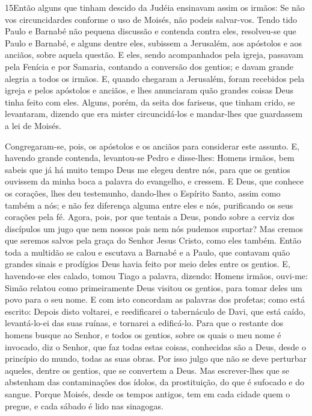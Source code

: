 \lettrine{15} Então alguns que tinham descido da Judéia
ensinavam assim os irmãos: Se não vos circuncidardes conforme o uso
de Moisés, não podeis salvar-vos. Tendo tido Paulo e Barnabé não
pequena discussão e contenda contra eles, resolveu-se que Paulo e
Barnabé, e alguns dentre eles, subissem a Jerusalém, aos apóstolos e
aos anciãos, sobre aquela questão. E eles, sendo acompanhados
pela igreja, passavam pela Fenícia e por Samaria, contando a
conversão dos gentios; e davam grande alegria a todos os irmãos.
E, quando chegaram a Jerusalém, foram recebidos pela igreja e
pelos apóstolos e anciãos, e lhes anunciaram quão grandes coisas
Deus tinha feito com eles. Alguns, porém, da seita dos fariseus,
que tinham crido, se levantaram, dizendo que era mister
circuncidá-los e mandar-lhes que guardassem a lei de Moisés.

Congregaram-se, pois, os apóstolos e os anciãos para considerar
este assunto. E, havendo grande contenda, levantou-se Pedro e
disse-lhes: Homens irmãos, bem sabeis que já há muito tempo Deus me
elegeu dentre nós, para que os gentios ouvissem da minha boca a
palavra do evangelho, e cressem. E Deus, que conhece os
corações, lhes deu testemunho, dando-lhes o Espírito Santo, assim
como também a nós; e não fez diferença alguma entre eles e nós,
purificando os seus corações pela fé. Agora, pois, por que
tentais a Deus, pondo sobre a cerviz dos discípulos um jugo que nem
nossos pais nem nós pudemos suportar? Mas cremos que seremos
salvos pela graça do Senhor Jesus Cristo, como eles também.
Então toda a multidão se calou e escutava a Barnabé e a
Paulo, que contavam quão grandes sinais e prodígios Deus havia feito
por meio deles entre os gentios. E, havendo-se eles calado,
tomou Tiago a palavra, dizendo: Homens irmãos, ouvi-me: Simão
relatou como primeiramente Deus visitou os gentios, para tomar deles
um povo para o seu nome. E com isto concordam as palavras dos
profetas; como está escrito: Depois disto voltarei, e
reedificarei o tabernáculo de Davi, que está caído, levantá-lo-ei
das suas ruínas, e tornarei a edificá-lo. Para que o restante
dos homens busque ao Senhor, e todos os gentios, sobre os quais o
meu nome é invocado, diz o Senhor, que faz todas estas coisas,
conhecidas são a Deus, desde o princípio do mundo, todas as
suas obras. Por isso julgo que não se deve perturbar aqueles,
dentre os gentios, que se convertem a Deus. Mas escrever-lhes
que se abstenham das contaminações dos ídolos, da prostituição, do
que é sufocado e do sangue. Porque Moisés, desde os tempos
antigos, tem em cada cidade quem o pregue, e cada sábado é lido nas
sinagogas.

